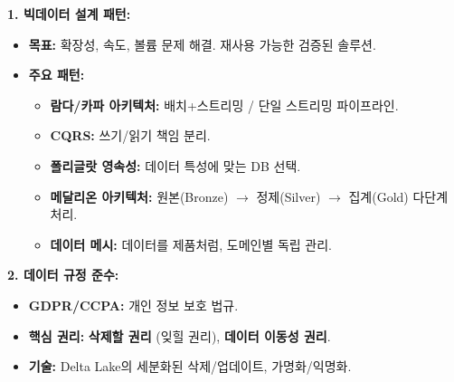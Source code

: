 \documentclass[11pt,a4paper]{article}
\begin{document}
\begin{tcolorbox}[colback=blue!5!white, colframe=blue!75!black, title=\textbf{CSCI103 Lecture 4: 데이터 변환 핵심 요약}]
\textbf{1. 빅데이터 설계 패턴:}
\begin{itemize}
    \item \textbf{목표:} 확장성, 속도, 볼륨 문제 해결. 재사용 가능한 검증된 솔루션.
    \item \textbf{주요 패턴:}
    \begin{itemize}
        \item \textbf{람다/카파 아키텍처:} 배치+스트리밍 / 단일 스트리밍 파이프라인.
        \item \textbf{CQRS:} 쓰기/읽기 책임 분리.
        \item \textbf{폴리글랏 영속성:} 데이터 특성에 맞는 DB 선택.
        \item \textbf{메달리온 아키텍처:} 원본(Bronze) $\rightarrow$ 정제(Silver) $\rightarrow$ 집계(Gold) 다단계 처리.
        \item \textbf{데이터 메시:} 데이터를 제품처럼, 도메인별 독립 관리.
    \end{itemize}
\end{itemize}

\textbf{2. 데이터 규정 준수:}
\begin{itemize}
    \item \textbf{GDPR/CCPA:} 개인 정보 보호 법규.
    \item \textbf{핵심 권리:} \textbf{삭제할 권리} (잊힐 권리), \textbf{데이터 이동성 권리}.
    \item \textbf{기술:} Delta Lake의 세분화된 삭제/업데이트, 가명화/익명화.
\end{itemize}


\end{tcolorbox}
\end{document}
